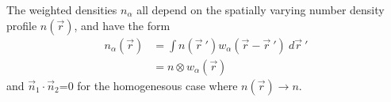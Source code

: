 \documentclass[double,12pt]{beavtex}
\begin{document}
The weighted densities $n_\alpha$ all depend on the spatially varying 
number density profile $n(\vec r)$, and have the form
\begin{align}
    n_\alpha(\vec r) &= \int n(\vec {r}~')w_\alpha(\vec r-\vec {r}~')~d\vec {r}~'  \label{weighted_densities}  \\
                     &= n\otimes w_\alpha(\vec r)
\end{align}  
and  $\vec n_1\cdot\vec n_2$=0 for the homogenesous case where $n(\vec r)\rightarrow n$.
%
%
%
\end{document}
